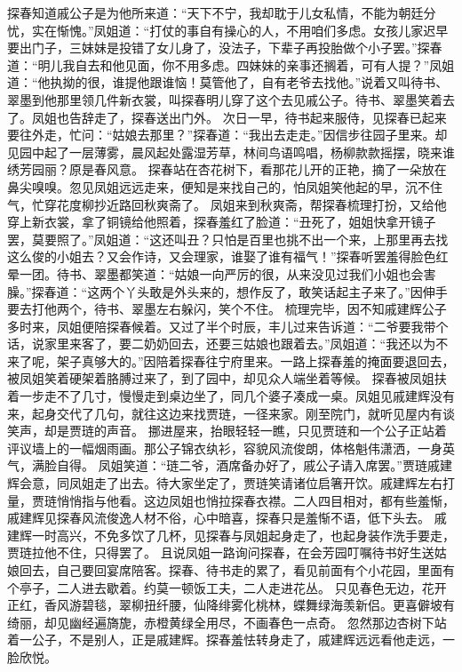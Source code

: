 \documentclass[12pt,oneside]{book}
\begin{document}
探春知道戚公子是为他所来道：“天下不宁，我却耽于儿女私情，不能为朝廷分忧，实在惭愧。”凤姐道：“打仗的事自有操心的人，不用咱们多虑。女孩儿家迟早要出门子，三妹妹是投错了女儿身了，没法子，下辈子再投胎做个小子罢。”探春道：“明儿我自去和他见面，你不用多虑。四妹妹的亲事还搁着，可有人提？”凤姐道：“他执拗的很，谁提他跟谁恼！莫管他了，自有老爷去找他。”说着又叫待书、翠墨到他那里领几件新衣裳，叫探春明儿穿了这个去见戚公子。待书、翠墨笑着去了。凤姐也告辞走了，探春送出门外。
次日一早，待书起来服侍，见探春已起来要往外走，忙问：“姑娘去那里？”探春道：“我出去走走。”因信步往园子里来。却见园中起了一层薄雾，晨风起处露湿芳草，林间鸟语鸣唱，杨柳款款摇摆，晓来谁绣芳园丽？原是春风意。
探春站在杏花树下，看那花儿开的正艳，摘了一朵放在鼻尖嗅嗅。忽见凤姐远远走来，便知是来找自己的，怕凤姐笑他起的早，沉不住气，忙穿花度柳抄近路回秋爽斋了。
凤姐来到秋爽斋，帮探春梳理打扮，又给他穿上新衣裳，拿了铜镜给他照着，探春羞红了脸道：“丑死了，姐姐快拿开镜子罢，莫要照了。”凤姐道：“这还叫丑？只怕是百里也挑不出一个来，上那里再去找这么俊的小姐去？又会作诗，又会理家，谁娶了谁有福气！”探春听罢羞得脸色红晕一团。待书、翠墨都笑道：“姑娘一向严厉的很，从来没见过我们小姐也会害臊。”探春道：“这两个丫头敢是外头来的，想作反了，敢笑话起主子来了。”因伸手要去打他两个，待书、翠墨左右躲闪，笑个不住。
梳理完毕，因不知戚建辉公子多时来，凤姐便陪探春候着。又过了半个时辰，丰儿过来告诉道：“二爷要我带个话，说家里来客了，要二奶奶回去，还要三姑娘也跟着去。”凤姐道：“我还以为不来了呢，架子真够大的。”因陪着探春往宁府里来。一路上探春羞的掩面要退回去，被凤姐笑着硬架着胳膊过来了，到了园中，却见众人端坐着等候。
探春被凤姐扶着一步走不了几寸，慢慢走到桌边坐了，同几个婆子凑成一桌。凤姐见戚建辉没有来，起身交代了几句，就往这边来找贾琏，一径来家。刚至院门，就听见屋内有谈笑声，却是贾琏的声音。
挪进屋来，抬眼轻轻一瞧，只见贾琏和一个公子正站着评议墙上的一幅烟雨画。那公子锦衣纨衫，容貌风流俊朗，体格魁伟潇洒，一身英气，满脸自得。
凤姐笑道：“琏二爷，酒席备办好了，戚公子请入席罢。”贾琏戚建辉会意，同凤姐走了出去。待大家坐定了，贾琏笑请诸位启箸开饮。戚建辉左右打量，贾琏悄悄指与他看。这边凤姐也悄拉探春衣襟。二人四目相对，都有些羞惭，戚建辉见探春风流俊逸人材不俗，心中暗喜，探春只是羞惭不语，低下头去。
戚建辉一时高兴，不免多饮了几杯，见探春与凤姐起身走了，也起身装作洗手要走，贾琏拉他不住，只得罢了。
且说凤姐一路询问探春，在会芳园叮嘱待书好生送姑娘回去，自己要回宴席陪客。探春、待书走的累了，看见前面有个小花园，里面有个亭子，二人进去歇着。约莫一顿饭工夫，二人走进花丛。
只见春色无边，花开正红，香风游碧毯，翠柳扭纤腰，仙降绯雾化桃林，蝶舞绿海羡新侣。更喜僻坡有绮丽，却见幽经遍旖旎，赤橙黄绿全用尽，不画春色一点奇。
忽然那边杏树下站着一公子，不是别人，正是戚建辉。探春羞怯转身走了，戚建辉远远看他走远，一脸欣悦。
\end{document}

